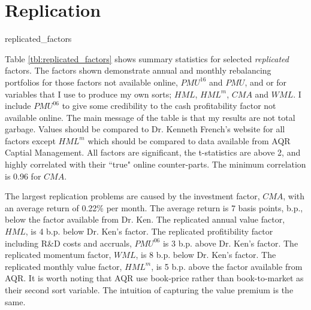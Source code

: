 
\section*{Replication}

{replicated_factors}

Table \ref{tbl:replicated_factors} shows summary statistics for selected
\emph{replicated} factors. The factors shown demonstrate annual and monthly
rebalancing portfolios for those factors not available online, $PMU^{16}$ and
$PMU$, and  or for variables that I use to produce my own sorts; $HML$,
$HML^m$, $CMA$ and $WML$. I include $PMU^{06}$ to give some credibility to the
cash profitability factor not available online. The main message of the table
is that my results are not total garbage. Values should be compared to Dr.
Kenneth French's website for all factors except $HML^m$ which should be
compared to data available from AQR Captial Management. All factors are
significant, the t-statistics are above 2, and highly correlated with their
``true" online counter-parts. The minimum correlation is 0.96 for $CMA$.

The largest replication problems are caused by the investment factor, $CMA$,
with an average return of 0.22\% per month. The average return is 7 basis
points, b.p., below the factor available from Dr. Ken. The replicated annual
value factor, $HML$, is 4 b.p. below Dr. Ken's factor. The replicated
profitibility factor including R\&D costs and accruals, $PMU^{06}$ is 3 b.p.
above Dr. Ken's factor. The replicated momentum factor, $WML$, is 8 b.p. below
Dr. Ken's factor. The replicated monthly value factor, $HML^m$, is 5 b.p. above
the factor available from AQR. It is worth noting that AQR use book-price
rather than book-to-market as their second sort variable. The intuition of
capturing the value premium is the same.
